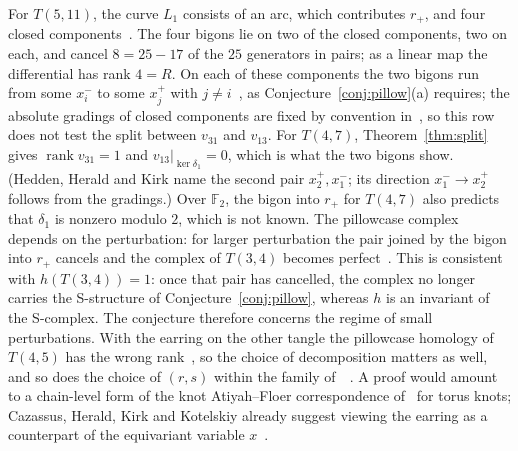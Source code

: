 \documentclass[11pt,reqno]{amsart}
\theoremstyle{plain}
\theoremstyle{definition}
\begin{document}
For $T(5,11)$, the curve $L_1$ consists of an arc, which contributes $r_+$, and four closed
components~\cite[\S11.1]{HHK2}. The four bigons lie on two of the closed components, two on each, and
cancel $8=25-17$ of the $25$ generators in pairs; as a linear map the differential has rank $4=R$. On each
of these components the two bigons run from some $x_i^-$ to some $x_j^+$ with $j\neq i$~\cite[\S3.9]{HHK2},
as Conjecture~\ref{conj:pillow}(a) requires; the absolute gradings of closed components are fixed by
convention in~\cite{HHK2}, so this row does not test the split between $v_{31}$ and $v_{13}$.
For $T(4,7)$, Theorem~\ref{thm:split} gives $\operatorname{rank}v_{31}=1$ and $v_{13}|_{\ker\delta_1}=0$,
which is what the two bigons show. (Hedden, Herald and Kirk name the second pair $x_2^+,x_1^-$; its
direction $x_1^-\to x_2^+$ follows from the gradings.) Over $\mathbb F_2$, the bigon into $r_+$ for $T(4,7)$
also predicts that $\delta_1$ is nonzero modulo $2$, which is not known. The pillowcase complex depends on
the perturbation: for larger perturbation the pair joined by the bigon into $r_+$ cancels and the complex
of $T(3,4)$ becomes perfect~\cite[\S11.10, Prop.~11.1]{HHK2}. This is consistent with $h(T(3,4))=1$: once
that pair has cancelled, the complex no longer carries the S-structure of Conjecture~\ref{conj:pillow},
whereas $h$ is an invariant of the S-complex. The conjecture therefore concerns the regime of small
perturbations. With the earring on the other tangle the pillowcase homology of $T(4,5)$ has the wrong
rank~\cite[\S10.3]{CHKK}, so the choice of decomposition matters as well, and so does the choice of $(r,s)$
within the family of~\cite[\S10]{HHK2}~\cite{Wpill}. A proof would amount to a
chain-level form of the knot Atiyah--Floer correspondence of~\cite{HHK2,CHKK} for torus knots;
Cazassus, Herald, Kirk and Kotelskiy already suggest viewing the earring as a counterpart of the
equivariant variable $x$~\cite[\S11.6]{CHKK}.
\end{document}
